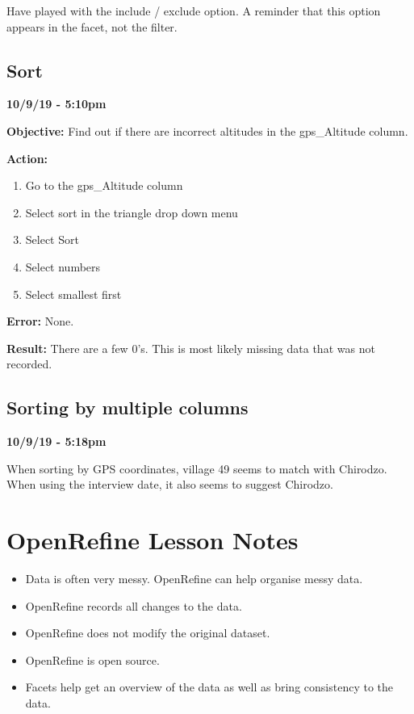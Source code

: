 \documentclass{article}
\begin{document}
Have played with the include / exclude option. A reminder that this option appears in the facet, not the filter.

\subsection{Sort}

\textbf{10/9/19 - 5:10pm}

\textbf{Objective:} Find out if there are incorrect altitudes in the gps\_Altitude column.

\textbf{Action:}

\begin{enumerate}
    \item Go to the gps\_Altitude column
    \item Select sort in the triangle drop down menu
    \item Select Sort
    \item Select numbers
    \item Select smallest first
\end{enumerate}

\textbf{Error:} None.

\textbf{Result:} There are a few 0's. This is most likely missing data that was not recorded.

\subsection{Sorting by multiple columns}

\textbf{10/9/19 - 5:18pm}

When sorting by GPS coordinates, village 49 seems to match with Chirodzo. When using the interview date, it also seems to suggest Chirodzo.

\newpage
\section{OpenRefine Lesson Notes}

\begin{itemize}
    \item Data is often very messy. OpenRefine can help organise messy data.
    \item OpenRefine records all changes to the data.
    \item OpenRefine does not modify the original dataset.
    \item OpenRefine is open source.
    \item Facets help get an overview of the data as well as bring consistency to the data.
\end{itemize}
\end{document}
